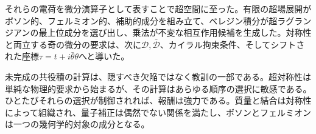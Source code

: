 それらの電荷を微分演算子として表すことで超空間に至った。有限の超場展開がボソン的、フェルミオン的、補助的成分を組み立て、ベレジン積分が超ラグランジアンの最上位成分を選び出し、乗法が不変な相互作用候補を生成した。対称性と両立する奇の微分の要求は、次に\(\mathcal D,\bar{\mathcal D}\)、カイラル拘束条件、そしてシフトされた座標\(\tau=t+i\bar\theta\theta\)へと導いた。

未完成の共役積の計算は、隠すべき欠陥ではなく教訓の一部である。超対称性は単純な物理的要求から始まるが、その計算はあらゆる順序の選択に敏感である。ひとたびそれらの選択が制御されれば、報酬は強力である。質量と結合は対称性によって組織され、量子補正は偶然でない関係を満たし、ボソンとフェルミオンは一つの幾何学的対象の成分となる。

